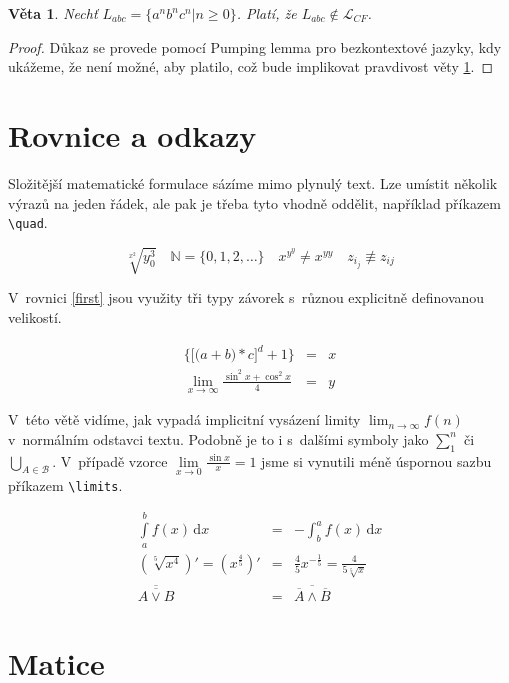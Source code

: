 \documentclass[a4paper, 11pt, twocolumn]{article}
\theoremstyle{definition}
\theoremstyle{plain}
\theoremstyle{plain}
\newtheorem{veta}{Věta}
\begin{document}
	\begin{veta}\label{veta1}
		Nechť $L_{abc}=\{a^n b^n c^n | n \ge 0\}$. Platí, že $L_{abc} \not \in \mathcal{L}_{CF}$.
	\end{veta}
		
	\begin{proof}\label{dukaz}
	Důkaz se provede pomocí Pumping lemma pro bezkontextové jazyky, kdy ukážeme, že není možné, aby platilo, což bude implikovat pravdivost věty \ref{veta1}.
	\end{proof}
	
	\section{Rovnice a odkazy}

	Složitější matematické formulace sázíme mimo plynulý text. Lze umístit několik výrazů na jeden řádek, ale pak je třeba tyto vhodně oddělit, například příkazem \verb|\quad|. 

	$$ \sqrt[x^2]{y^3_0} \quad \mathbb{N} = \{0,1,2,\dots\}   \quad x^{y^y} \neq x^{yy} \quad z_{i_j} \not\equiv z_{ij} $$

	V~rovnici \eqref{first} jsou využity tři typy závorek s~různou explicitně definovanou velikostí.

	\begin{eqnarray}\label{first}
	\bigg\{\Big[\big(a+b\big) * c\Big]^d + 1\bigg\} & = &x\\
	\lim_{x \to \infty}\frac{\sin^2x + \cos^2x}{4} &=& y \nonumber
	\end{eqnarray}
	
	V~této větě vidíme, jak vypadá implicitní vysázení limity $\lim_{n \to \infty}f(n)$ v~normálním odstavci textu. Podobně je to i s~dalšími symboly jako $\sum_1^n$ či $\bigcup_{A \in \mathcal{B}}$. V~případě vzorce $\lim\limits_{x \to 0}\frac{\sin x}{x}=1$ jsme si vynutili méně úspornou sazbu příkazem \verb|\limits|.

	\begin{eqnarray}
	\int\limits_{a}^{b}  f(x)\,\mathrm{d}x &=& - \int_b^a  f(x) \, \mathrm{d}x \\
	\left(\sqrt[5]{x^4}\right)' = \left(x^{\frac{4}{5}}\right)' &=& \frac{4}{5} x^{- \frac{1}{5}} = \frac{4}{5\sqrt[5]{x}} \\
	\overline{\overline{A \lor B}} &=& \overline{\overline{A} \land \overline{B}}
	\end{eqnarray}
	
	\section{Matice}
\end{document}
